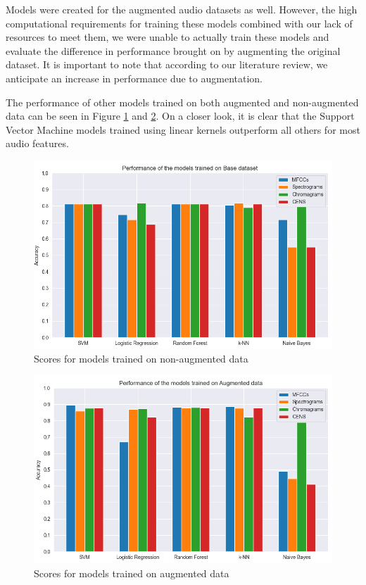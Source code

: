 \documentclass[10pt,twocolumn,letterpaper]{article}
\begin{document}
Models were created for the augmented audio datasets as well. However, the high computational requirements for training these models combined with our lack of resources to meet them, we were unable to actually train these models and evaluate the difference in performance brought on by augmenting the original dataset. It is important to note that according to our literature review, we anticipate an increase in performance due to augmentation.

The performance of other models trained on both augmented and non-augmented data can be seen in Figure \ref{fig:non-aug} and \ref{fig:aug}.
On a closer look, it is clear that the Support Vector Machine models trained using linear kernels outperform all others for most audio features.
\begin{figure}
    \centering
    \includegraphics[scale=0.3]{non-aug_accuracies.png}
    \caption{Scores for models trained on non-augmented data}
    \label{fig:non-aug}
\end{figure}
\begin{figure}
    \centering
    \includegraphics[scale=0.3]{aug_accuracies.png}
    \caption{Scores for models trained on augmented data}
    \label{fig:aug}
\end{figure}
\end{document}
